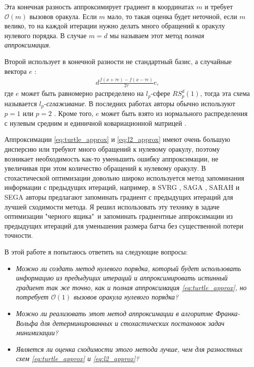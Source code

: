     Эта конечная разность аппроксимирует градиент в координатах $m$ и требует $\mathcal{O}(m)$ вызовов оракула. Если $m$ мало, то такая оценка будет неточной, если $m$ велико, то на каждой итерации нужно делать много обращений к оракулу нулевого порядка. В случае $m = d$ мы называем этот метод \textit{полная аппроксимация}.

    Второй использует в конечной разности не стандартный базис, а случайные вектора $e$ \cite{duchi2012randomized, nesterov2017random, gasnikov2022power, Randomized_gradient_free_methods_in_convex_optimization}:
    \begin{align} \label{eq:l2_approx}
        d \frac{f(x + \tau e) - f(x - \tau e)}{2 \tau} e,
    \end{align}
    где $e$ может быть равномерно распределено на $l_p$-сфере $RS^d_p(1)$, тогда эта схема называется $l_p$-\textit{сглаживание}. В последних работах авторы обычно используют $p = 1$ \cite{gasnikov2016gradient-free, akhavan2022gradient} или $p=2$ \cite{nemirovskij1983problem, shamir2017optimal, doi:10.1137/19M1259225}. Кроме того, $e$ может быть взято из нормального распределения с нулевым средним и единичной ковариационной матрицей \cite{nesterov2017random}.

    Аппроксимации \eqref{eq:turtle_approx} и \eqref{eq:l2_approx} имеют очень большую дисперсию или требуют много обращений к нулевому оракулу, поэтому возникает необходимость как-то уменьшить ошибку аппроксимации, не увеличивая при этом количество обращений к нулевому оракулу. В стохастической оптимизации довольно широко используется метод запоминания информации с предыдущих итераций, например, в SVRG \cite{johnson2013accelerating}, SAGA \cite{defazio2014saga}, SARAH \cite{nguyen2017sarah} и SEGA \cite{hanzely2018sega} авторы предлагают запоминать градиент с предыдущих итераций для лучшей сходимости метода.
    Я решил использовать эту технику в задаче оптимизации "черного ящика"\ и запоминать градиентные аппроксимации из предыдущих итераций для уменьшения размера батча без существенной потери точности.

    В этой работе я попытаюсь ответить на следующие вопросы:

    \begin{itemize}
        \item \textit{Можно ли создать метод нулевого порядка, который будет использовать информацию из предыдущих итераций и аппроксимировать истинный градиент так же точно, как и полная аппроксимация \eqref{eq:turtle_approx}, но потребует $\mathcal{O}(1)$ вызовов оракула нулевого порядка?}
        \item \textit{Можно ли реализовать этот метод аппроксимации в алгоритме Франка-Вольфа для детерминированных и стохастических постановок задач минимизации?}
        \item \textit{Является ли оценка сходимости этого метода лучше, чем для разностных схем \eqref{eq:turtle_approx} и \eqref{eq:l2_approx}?}
    \end{itemize}

